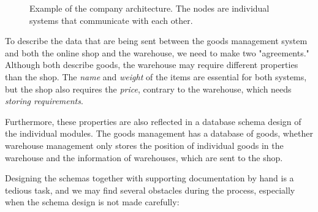 \begin{figure}[h]\centering
  \caption{Example of the company architecture. The nodes are individual systems that communicate with each other.}
  \label{fig:company-schema}
\end{figure}

To describe the data that are being sent between the goods management system and both the online shop and the warehouse, we need to make two "agreements." Although both describe goods, the warehouse may require different properties than the shop. The \textit{name} and \textit{weight} of the items are essential for both systems, but the shop also requires the \textit{price}, contrary to the warehouse, which needs \textit{storing requirements}.

Furthermore, these properties are also reflected in a database schema design of the individual modules. The goods management has a database of goods, whether warehouse management only stores the position of individual goods in the warehouse and the information of warehouses, which are sent to the shop.

\medskip

Designing the schemas together with supporting documentation by hand is a tedious task, and we may find several obstacles during the process, especially when the schema design is not made carefully:

